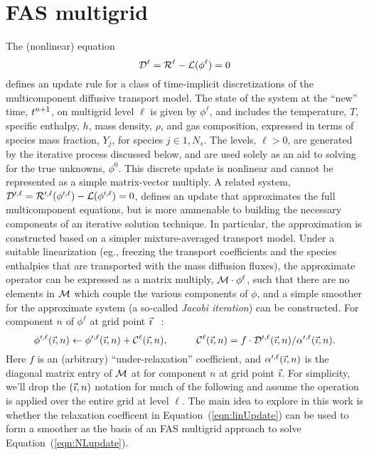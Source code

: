 \documentclass[11pt]{article}
\begin{document}
\section{FAS multigrid}
The (nonlinear) equation
\begin{equation}
   {\cal D}^{\ell} = {\cal R}^{\ell} - {\cal L}({\phi}^{\ell}) = 0 
  \label{eqn:NLupdate}
\end{equation}
defines an update rule for a class of time-implicit discretizations of
the multicomponent diffusive transport model.  The state of the system
at the ``new'' time, ${t^{n+1}}$, on multigrid level $\ell$ is given by
${\phi}^{\ell}$, and includes the temperature, $T$, specific enthalpy,
$h$, mass density, $\rho$, and gas composition, expressed in terms of
species mass fraction, $Y_{j}$, for species $j\in{1,N_{s}}$.  The
levels, $\ell>0$, are generated by the iterative process discussed
below, and are used solely as an aid to solving for the true unknowns,
${\phi}^{0}$.  This discrete update is nonlinear and cannot be
represented as a simple matrix-vector multiply.  A related system,
${\cal D}^{\prime,\ell} = {\cal R}^{\prime,\ell}({\phi}^{\prime,\ell})
- {\cal L}({\phi}^{\prime,\ell}) = 0$, defines an update that
approximates the full multicomponent equations, but is more ammenable
to building the necessary components of an iterative solution
technique.  In particular, the approximation is constructed based on a
simpler mixture-averaged transport model.  Under a suitable
linearization (eg., freezing the transport coefficients and the
species enthalpies that are transported with the mass diffusion
fluxes), the approximate operator can be expressed as a matrix
multiply, ${\cal M} \cdot {\phi}^{\ell}$, such that there are no
elements in ${\cal M}$ which couple the various components of $\phi$,
and a simple smoother for the approximate system
(a so-called {\it Jacobi iteration}) can be constructed.  For
component $n$ of ${\phi}^{\ell}$ at grid point ${\vec \imath}$ \ :
\begin{equation}
       {\phi}^{\prime,\ell}({\vec \imath},n) \leftarrow {\phi}^{\prime,\ell}({\vec \imath},n) + {\cal C}^{\ell}({\vec \imath},n), \hspace{1cm}
                {\cal C}^{\ell}({\vec \imath},n) = f \cdot {\cal D}^{\prime,\ell}({\vec \imath},n) / {\alpha}^{\prime,\ell}({\vec \imath},n).
  \label{eqn:linUpdate}
\end{equation}
Here $f$ is an (arbitrary) ``under-relaxation'' coefficient, and
${\alpha}^{\prime,\ell}({\vec \imath},n)$ is the diagonal matrix entry of ${\cal
  M}$ at for component $n$ at grid point ${\vec \imath}$.  For simplicity, we'll
drop the $({\vec \imath},n)$ notation for much of the following and assume the
operation is applied over the entire grid at level $\ell$.  The main
idea to explore in this work is whether the relaxation coefficent in
Equation~(\ref{eqn:linUpdate}) can be used to form a smoother as the
basis of an FAS multigrid approach to solve
Equation~(\ref{eqn:NLupdate}).
\end{document}
